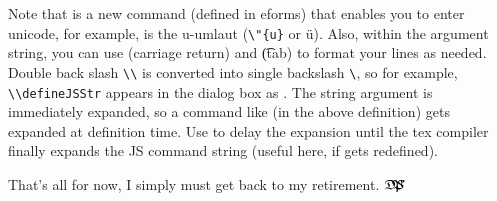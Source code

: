 \documentclass{article}
\def\dps{$\hbox{$\mathfrak D$\kern-.3em\hbox{$\mathfrak P$}%
   \kern-.6em \hbox{$\mathcal S$}}$}
\begin{document}
\newtopic Note that  is a new command (defined in \textsf{eforms}) that enables you
to enter unicode, for example,  is the u-umlaut (\verb!\"{u}! or \"{u}). Also, within the
argument string, you can use  (carriage return) and \t (tab) to format your lines as
needed. Double back slash \verb!\\! is converted into single backslash \verb!\!,
so for example, \verb!\\defineJSStr! appears in the dialog box as
. The string argument is immediately expanded, so a
command like  (in the above definition) gets
expanded at definition time. Use  to delay the expansion
until the tex compiler finally expands the JS command string (useful here, if
 gets redefined).



\bigskip
That's all for now, I simply must get back to my retirement. \dps

\newpage
{}\small
{}
\printindex
\end{document}
